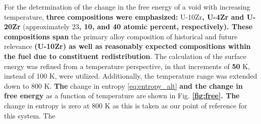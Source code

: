 \documentclass[review]{elsarticle}
\providecommand{\DIFaddtex}[1]{{\bf #1}} %
\providecommand{\DIFdeltex}[1]{} %
\providecommand{\DIFaddbegin}{\protect\color{blue}} %
\providecommand{\DIFaddend}{\protect\color{black}} %
\providecommand{\DIFdelbegin}{\protect\color{red}} %
\providecommand{\DIFdelend}{\protect\color{black}} %
\providecommand{\DIFdelFL}[1]{\DIFdel{#1}} %
\providecommand{\DIFadd}[1]{\texorpdfstring{\DIFaddtex{#1}}{#1}} %
\providecommand{\DIFdel}[1]{\texorpdfstring{\DIFdeltex{#1}}{}} %
\newcommand{\DIFscaledelfig}{0.5}
\newlength{\DIFdelgraphicswidth} %
\newlength{\DIFdelgraphicsheight} %
\newcommand{\DIFaddincludegraphics}[2][]{{\color{blue}\fbox{\DIFOincludegraphics[#1]{#2}}}} %
\newcommand{\DIFdelincludegraphics}[2][]{%
\sbox{\DIFdelgraphicsbox}{\DIFOincludegraphics[#1]{#2}}%
\settoboxwidth{\DIFdelgraphicswidth}{\DIFdelgraphicsbox} %
\settoboxtotalheight{\DIFdelgraphicsheight}{\DIFdelgraphicsbox} %
\scalebox{\DIFscaledelfig}{%
\parbox[b]{\DIFdelgraphicswidth}{\usebox{\DIFdelgraphicsbox}\\[-\baselineskip] \rule{\DIFdelgraphicswidth}{0em}}\llap{\resizebox{\DIFdelgraphicswidth}{\DIFdelgraphicsheight}{%
\setlength{\unitlength}{\DIFdelgraphicswidth}%
\begin{picture}(1,1)%
\thicklines\linethickness{2pt} %
{\color[rgb]{1,0,0}\put(0,0){\framebox(1,1){}}}%
{\color[rgb]{1,0,0}\put(0,0){\line( 1,1){1}}}%
{\color[rgb]{1,0,0}\put(0,1){\line(1,-1){1}}}%
\end{picture}%
}\hspace*{3pt}}} %
} %
\DeclareRobustCommand{\DIFaddbegin}{\DIFOaddbegin \let\includegraphics\DIFaddincludegraphics} %
\DeclareRobustCommand{\DIFaddend}{\DIFOaddend \let\includegraphics\DIFOincludegraphics} %
\DeclareRobustCommand{\DIFdelbegin}{\DIFOdelbegin \let\includegraphics\DIFdelincludegraphics} %
\DeclareRobustCommand{\DIFdelend}{\DIFOaddend \let\includegraphics\DIFOincludegraphics} %
\begin{document}
For the determination of the change in the free energy of a void with increasing temperature, \DIFdelbegin \DIFdel{a single composition was emphasized, that of }\DIFdelend \DIFaddbegin \DIFadd{three compositions were emphasized: }\DIFaddend U-10Zr\DIFaddbegin \DIFadd{, U-4Zr and U-20Zr }\DIFaddend (approximately 23\DIFdelbegin \DIFdel{atomic percent), as this is }\DIFdelend \DIFaddbegin \DIFadd{, 10, and 40 atomic percent, respectively). These compositions span }\DIFaddend the primary alloy composition of historical and future relevance \DIFaddbegin \DIFadd{(U-10Zr) as well as reasonably expected compositions within the fuel due to constituent redistribution}\DIFaddend . The calculation of the surface energy was refined from a temperature perspective, in that increments of \DIFdelbegin \DIFdel{25 }\DIFdelend \DIFaddbegin \DIFadd{50 }\DIFaddend K, instead of 100 K, were utilized. Additionally, the temperature range was extended down to 800 K. \DIFdelbegin \DIFdel{Finally, the number of simulations for each individual system was increased from 5 to 50, to refine the accuracy of the dataset. The refined surface energy (eq. \ref{eq:surface} as a function of temperature and the }\DIFdelend \DIFaddbegin \DIFadd{The }\DIFaddend change in entropy \ref{eq:entropy_alt} \DIFaddbegin \DIFadd{and the change in free energy }\DIFaddend as a function of temperature are shown in Fig. \DIFdelbegin \DIFdel{\ref{fig:u23void}. The surface energy increases with increasing temperature, from approximately 1.6 J/m$^2$ at 800 K to 1.75 J/m$^2$ at 1300 K. This leads to a positive entropy increase with increasing temperature. The }\DIFdelend \DIFaddbegin \DIFadd{\ref{fig:free}. The }\DIFaddend change in entropy is zero at 800 K as this is taken as our point of reference for this system. The \DIFdelbegin \DIFdel{data for this system is somewhat noisy, due to both temperature and compositional effects, in spite of efforts to increase the statistical certainty by increasing the sample size. 
}%
{%
\DIFdelFL{Change in the surface energy and entropy as a function of temperature in $\gamma$U-10Zr.}}
\end{document}
